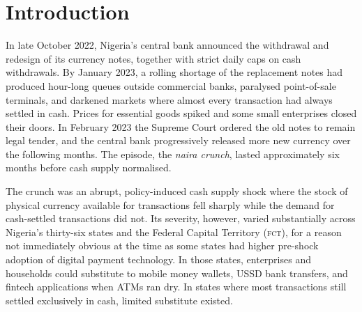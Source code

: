 
\section{Introduction}
\label{sec:intro}

In late October 2022, Nigeria's central bank announced the withdrawal and
redesign of its currency notes, together with strict daily caps on cash
withdrawals. By January 2023, a rolling shortage of the replacement notes had
produced hour-long queues outside commercial banks, paralysed point-of-sale
terminals, and darkened markets where almost every transaction had always
settled in cash. Prices for essential goods spiked and some small enterprises closed
their doors. In February 2023 the Supreme Court ordered the old notes to remain
legal tender, and the central bank progressively released more new currency
over the following months. The episode, the \emph{naira crunch}, lasted
approximately six months before cash supply normalised.

The crunch was an abrupt, policy-induced cash supply shock where the stock of
physical currency available for transactions fell sharply while the demand for
cash-settled transactions did not. Its severity, however, varied substantially
across Nigeria's thirty-six states and the Federal Capital Territory
(\textsc{fct}), for a reason not immediately obvious at
the time as some states had higher pre-shock adoption of digital
payment technology. In those states, enterprises and households could substitute
to mobile money wallets, USSD bank transfers, and fintech applications when
ATMs ran dry. In states where most transactions still settled exclusively in
cash, limited substitute existed.

